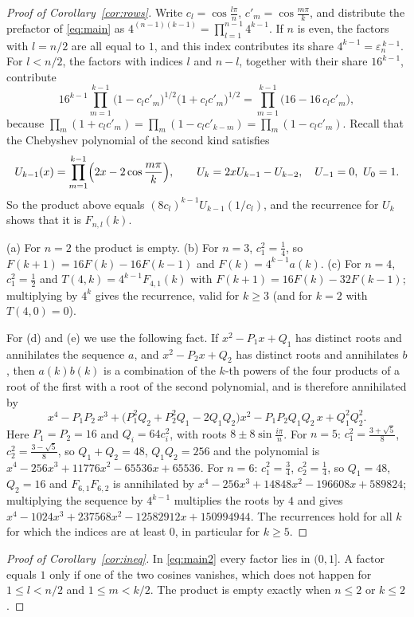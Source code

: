 \documentclass[11pt,a4paper]{amsart}
\theoremstyle{remark}
\begin{document}
\begin{proof}[Proof of Corollary~\ref{cor:rows}]
Write $c_l=\cos\frac{l\pi}{n}$, $c'_m=\cos\frac{m\pi}{k}$, and distribute the prefactor of \eqref{eq:main} as
$4^{(n-1)(k-1)}=\prod_{l=1}^{n-1}4^{k-1}$. If $n$ is even, the factors with $l=n/2$ are all equal to $1$, and
this index contributes its share $4^{k-1}=\varepsilon_n^{\,k-1}$.
For $l<n/2$, the factors with indices $l$ and $n-l$, together with their share $16^{k-1}$, contribute
\[ 16^{k-1}\prod_{m=1}^{k-1}\bigl(1-c_lc'_m\bigr)^{1/2}\bigl(1+c_lc'_m\bigr)^{1/2}
=\prod_{m=1}^{k-1}\bigl(16-16\,c_lc'_m\bigr), \]
because $\prod_m(1+c_lc'_m)=\prod_m(1-c_lc'_{k-m})=\prod_m(1-c_lc'_m)$. Recall that the Chebyshev polynomial
of the second kind satisfies
\[ U_{k-1}(x)=\prod_{m=1}^{k-1}\Bigl(2x-2\cos\frac{m\pi}{k}\Bigr),\qquad U_{k}=2xU_{k-1}-U_{k-2},\quad U_{-1}=0,\ U_0=1. \]
So the product above equals $(8c_l)^{k-1}U_{k-1}(1/c_l)$, and the recurrence for $U_k$ shows that it is
$F_{n,l}(k)$.

(a) For $n=2$ the product is empty. (b) For $n=3$, $c_1^2=\frac14$, so $F(k+1)=16F(k)-16F(k-1)$ and
$F(k)=4^{k-1}a(k)$. (c) For $n=4$, $c_1^2=\frac12$ and $T(4,k)=4^{k-1}F_{4,1}(k)$ with
$F(k+1)=16F(k)-32F(k-1)$; multiplying by $4^{k}$ gives the recurrence, valid for $k\ge3$ (and for $k=2$ with
$T(4,0)=0$).

For (d) and (e) we use the following fact. If $x^2-P_1x+Q_1$ has distinct roots and annihilates the sequence $a$,
and $x^2-P_2x+Q_2$ has distinct roots and annihilates $b$, then $a(k)b(k)$ is a combination of the $k$-th powers of
the four products of a root of the first with a root of the second polynomial, and is therefore annihilated by
\[ x^4-P_1P_2\,x^3+\bigl(P_1^2Q_2+P_2^2Q_1-2Q_1Q_2\bigr)x^2-P_1P_2Q_1Q_2\,x+Q_1^2Q_2^2 . \]
Here $P_1=P_2=16$ and $Q_i=64c_i^2$, with roots $8\pm8\sin\frac{i\pi}{n}$. For $n=5$:
$c_1^2=\frac{3+\sqrt5}{8}$, $c_2^2=\frac{3-\sqrt5}{8}$, so $Q_1+Q_2=48$, $Q_1Q_2=256$ and the polynomial is
$x^4-256x^3+11776x^2-65536x+65536$. For $n=6$: $c_1^2=\frac34$, $c_2^2=\frac14$, so $Q_1=48$, $Q_2=16$ and
$F_{6,1}F_{6,2}$ is annihilated by $x^4-256x^3+14848x^2-196608x+589824$; multiplying the sequence by $4^{k-1}$
multiplies the roots by $4$ and gives $x^4-1024x^3+237568x^2-12582912x+150994944$. The recurrences hold for all
$k$ for which the indices are at least $0$, in particular for $k\ge5$.
\end{proof}

\begin{proof}[Proof of Corollary~\ref{cor:ineq}]
In \eqref{eq:main2} every factor lies in $(0,1]$. A factor equals $1$ only if one of the two cosines
vanishes, which does not happen for $1\le l<n/2$ and $1\le m<k/2$. The product is empty exactly when $n\le2$ or
$k\le2$.
\end{proof}
\end{document}
